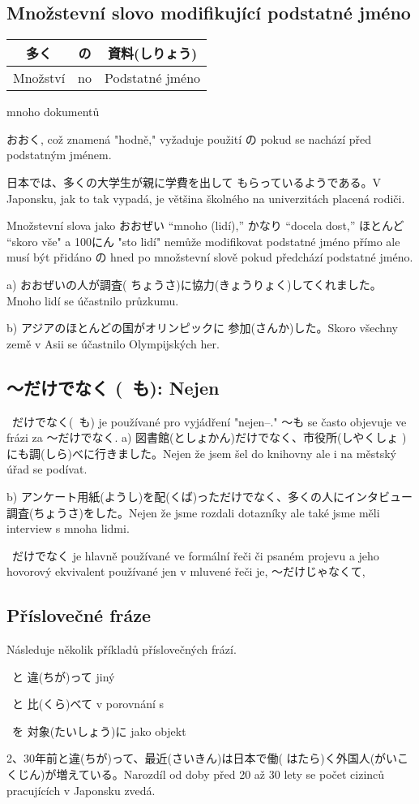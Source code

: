 \subsection{ Množstevní slovo modifikující podstatné jméno}
\begin{center}
\begin{tabular}{|c|c|c|}
\hline
多く&の&資料(しりょう)\\
\hline
Množství&no&Podstatné jméno\\
\hline
\end{tabular}
\end{center}
mnoho dokumentů



おおく, což znamená "hodně," vyžaduje použití の pokud se nachází před podstatným jménem. 

日本では、多くの大学生が親に学費を出して もらっているようである。V Japonsku, jak to tak vypadá, je většina školného na univerzitách placená rodiči.


Množstevní slova jako おおぜい “mnoho (lidí),” かなり “docela dost,” ほとんど “skoro vše" a 100にん "sto lidí" nemůže modifikovat podstatné jméno přímo ale musí být přidáno の  hned po množstevní slově pokud předchází podstatné jméno.

a) おおぜいの人が調査( ちょうさ)に協力(きょうりょく)してくれました。Mnoho lidí se účastnilo průzkumu.


b) アジアのほとんどの国がオリンピックに 参加(さんか)した。Skoro všechny země v Asii se účastnilo Olympijských her.

\subsection{ 〜だけでなく (~も): Nejen}


~だけでなく(~も) je používané pro vyjádření "nejen--." 〜も se často objevuje ve frázi za 〜だけでなく.
a) 図書館(としょかん)だけでなく、市役所(しやくしょ )にも調(しら)べに行きました。Nejen že jsem šel do knihovny ale i na městský úřad se podívat.


b) アンケート用紙(ようし)を配(くば)っただけでなく、多くの人にインタビュー調査(ちょうさ)をした。Nejen že jsme rozdali dotazníky ale také jsme měli interview s mnoha lidmi. 


~だけでなく je hlavně používané ve formální řeči či psaném projevu a jeho hovorový ekvivalent používané jen v mluvené řeči je, 〜だけじゃなくて, 
\subsection{ Příslovečné fráze}
Následuje několik příkladů příslovečných frází.

~と  違(ちが)って    jiný

~と 比(くら)べて v porovnání s

~を  対象(たいしょう)に   jako objekt


2、30年前と違(ちが)って、最近(さいきん)は日本で働( はたら)く外国人(がいこくじん)が増えている。Narozdíl od doby před 20 až 30 lety se počet cizinců pracujících v Japonsku zvedá.
























